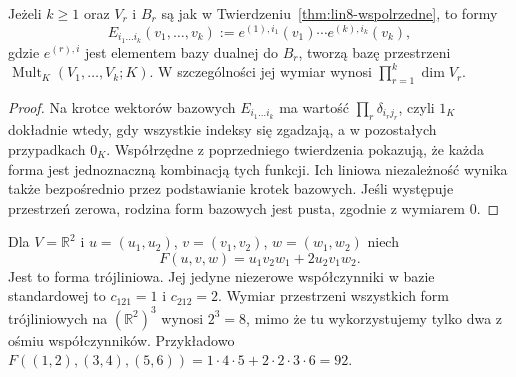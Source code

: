 \begin{wniosek}
\label{cor:lin8-baza-wieloliniowych}
Jeżeli \(k\geq1\) oraz
\(V_r\) i \(B_r\) są jak w
Twierdzeniu~\ref{thm:lin8-wspolrzedne},
to formy
\[
 E_{i_1\ldots i_k}(v_1,\ldots,v_k)
 :=e^{(1),i_1}(v_1)\cdots
   e^{(k),i_k}(v_k),
\]
gdzie \(e^{(r),i}\) jest elementem
bazy dualnej do \(B_r\),
tworzą bazę przestrzeni
\(\operatorname{Mult}_K(V_1,\ldots,V_k;K)\).
W szczególności jej wymiar wynosi
\(\prod_{r=1}^{k}\dim V_r\).
\end{wniosek}
\begin{proof}
Na krotce wektorów bazowych
\(E_{i_1\ldots i_k}\) ma wartość
\(\prod_r\delta_{i_rj_r}\),
czyli \(1_K\) dokładnie wtedy,
gdy wszystkie indeksy się zgadzają,
a w pozostałych przypadkach \(0_K\).
Współrzędne z poprzedniego
twierdzenia pokazują, że każda
forma jest jednoznaczną kombinacją
tych funkcji. Ich liniowa
niezależność wynika także
bezpośrednio przez podstawianie
krotek bazowych.
Jeśli występuje przestrzeń zerowa,
rodzina form bazowych jest pusta,
zgodnie z wymiarem \(0\).
\end{proof}

\begin{przyklad}
\label{prz:lin8-trojliniowa}
Dla \(V=\mathbb R^2\) i
\(u=(u_1,u_2)\),
\(v=(v_1,v_2)\),
\(w=(w_1,w_2)\) niech
\[
 F(u,v,w)=u_1v_2w_1
          +2u_2v_1w_2.
\]
Jest to forma trójliniowa.
Jej jedyne niezerowe
współczynniki w bazie standardowej
to \(c_{121}=1\) i \(c_{212}=2\).
Wymiar przestrzeni wszystkich
form trójliniowych na
\((\mathbb R^2)^3\) wynosi
\(2^3=8\), mimo że tu
wykorzystujemy tylko dwa z ośmiu
współczynników.
Przykładowo
\(F((1,2),(3,4),(5,6))
=1\cdot4\cdot5+
 2\cdot2\cdot3\cdot6=92\).
\end{przyklad}

